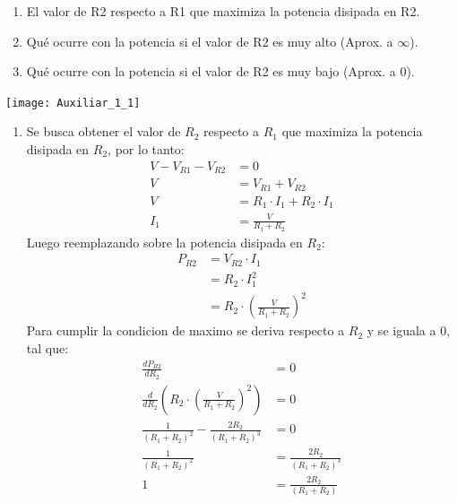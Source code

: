 \documentclass[
  11pt,
  letterpaper,
   addpoints,
   answers
  ]{exam}
\begin{document}
\begin{questions}
    \begin{enumerate}
        \item El valor de R2 respecto a R1 que maximiza la potencia disipada en R2.
        \item Qué ocurre con la potencia si el valor de R2 es muy alto (Aprox. a $\infty$).
        \item Qué ocurre con la potencia si el valor de R2 es muy bajo (Aprox. a 0).
    \end{enumerate}
    \begin{center}
        \texttt{[image: Auxiliar\_1\_1]}
    \end{center}
    \begin{solution}
        \begin{enumerate}
            \item Se busca obtener el valor de $R_2$ respecto a $R_{1}$ que maximiza la potencia disipada en $R_2$, por lo tanto:
            \begin{align}
            V - V_{R1} - V_{R2} &= 0\\
            V &= V_{R1} + V_{R2}\\
            V &= R_{1} \cdot I_{1} + R_{2} \cdot I_{1}\\
            I_{1} &= \frac{V}{R_{1} + R_{2}}
            \end{align}
            Luego reemplazando sobre la potencia disipada en $R_{2}$:
            \begin{align}
                P_{R2} &= V_{R2} \cdot I_{1}\\
                &= R_{2} \cdot I_{1}^{2}\\
                &= R_{2} \cdot \left( \frac{V}{R_{1} + R_{2}} \right)^{2}
            \end{align}
            Para cumplir la condicion de maximo se deriva respecto a $R_{2}$ y se iguala a 0, tal que:
            \begin{align}
                \frac{dP_{R2}}{dR_{2}} &= 0\\
                \frac{d}{dR_{2}} \left( R_{2} \cdot \left( \frac{V}{R_{1} + R_{2}} \right)^{2} \right) &= 0\\
                \frac{1}{(R_{1} + R_{2})^{2}} - \frac{2R_{2}}{(R_{1} + R_{2})^{3}} &= 0\\
                \frac{1}{(R_{1} + R_{2})^{2}} &= \frac{2R_{2}}{(R_{1} + R_{2})^{3}}\\
                1 &= \frac{2R_{2}}{(R_{1}+R_{2})}\\

\end{align}
\end{enumerate}
\end{solution}
\end{questions}
\end{document}
